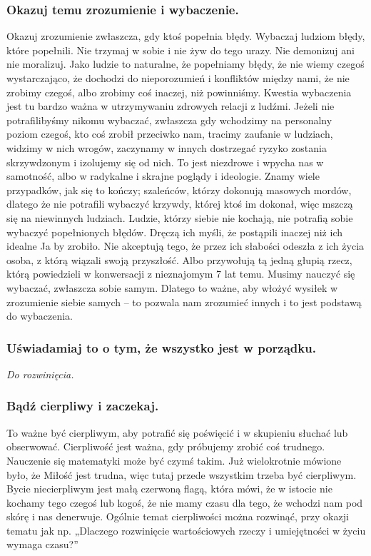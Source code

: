 \documentclass[../dotknieci-miloscia.tex]{subfiles}
\begin{document}
\subsubsection{Okazuj temu zrozumienie i wybaczenie.}
Okazuj zrozumienie zwłaszcza, gdy ktoś popełnia błędy. 
Wybaczaj ludziom błędy, które popełnili. 
Nie trzymaj w sobie i nie żyw do tego urazy.
Nie demonizuj ani nie moralizuj.
Jako ludzie to naturalne, że popełniamy błędy, 
że nie wiemy czegoś wystarczająco, 
że dochodzi do nieporozumień i konfliktów między nami, 
że nie zrobimy czegoś, albo zrobimy coś inaczej, niż powinniśmy. 
Kwestia wybaczenia jest tu bardzo ważna w utrzymywaniu zdrowych relacji z ludźmi. 
Jeżeli nie potrafilibyśmy nikomu wybaczać, 
zwłaszcza gdy wchodzimy na personalny poziom czegoś, kto coś zrobił przeciwko nam, 
tracimy zaufanie w ludziach, widzimy w nich wrogów, 
zaczynamy w innych dostrzegać ryzyko zostania skrzywdzonym i izolujemy się od nich. 
To jest niezdrowe i wpycha nas w samotność, albo w radykalne i skrajne poglądy i ideologie.
Znamy wiele przypadków, jak się to kończy; 
szaleńców, którzy dokonują masowych mordów, 
dlatego że nie potrafili wybaczyć krzywdy, której ktoś im dokonał, 
więc mszczą się na niewinnych ludziach. 
Ludzie, którzy siebie nie kochają, nie potrafią sobie wybaczyć popełnionych błędów. 
Dręczą ich myśli, że postąpili inaczej niż ich idealne Ja by zrobiło. 
Nie akceptują tego, że przez ich słabości odeszła z ich życia osoba, 
z którą wiązali swoją przyszłość. 
Albo przywołują tą jedną głupią rzecz, 
którą powiedzieli w konwersacji z nieznajomym 7 lat temu. 
Musimy nauczyć się wybaczać, zwłaszcza sobie samym. 
Dlatego to ważne, aby włożyć wysiłek w zrozumienie siebie samych 
-- to pozwala nam zrozumieć innych i to jest podstawą do wybaczenia. 

\subsubsection{Uświadamiaj to o tym, że wszystko jest w porządku.}
\emph{Do rozwinięcia.}

\subsubsection{Bądź cierpliwy i zaczekaj.}
To ważne być cierpliwym, aby potrafić się poświęcić i w skupieniu słuchać lub obserwować. 
Cierpliwość jest ważna, gdy próbujemy zrobić coś trudnego. 
Nauczenie się matematyki może być czymś takim. 
Już wielokrotnie mówione było, że Miłość jest trudna, 
więc tutaj przede wszystkim trzeba być cierpliwym. 
Bycie niecierpliwym jest małą czerwoną flagą, 
która mówi, że w istocie nie kochamy tego czegoś lub kogoś, 
że nie mamy czasu dla tego, 
że wchodzi nam pod skórę i nas denerwuje. 
Ogólnie temat cierpliwości można rozwinąć, przy okazji tematu jak np. 
„Dlaczego rozwinięcie wartościowych rzeczy i umiejętności w życiu wymaga czasu?” 
\end{document}
